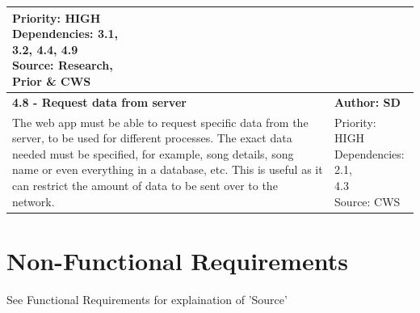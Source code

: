 \documentclass[10pt]{report}
\begin{document}
\begin{center}
\begin{longtable}{| p{13cm} | p{3cm} |}
\makecell{Priority: HIGH\\Dependencies: 3.1,\\3.2, 4.4, 4.9\\Source: Research,\\Prior \& CWS}\\
\hline
\textbf{4.8 -  Request data from server} & \textbf{Author: SD} \\
\hline
The web app must be able to request specific data from the server, to be used for different processes. The exact data needed must be specified, for example, song details, song name or even everything in a database, etc. This is useful as it can restrict the amount of data to be sent over to the network.&
\makecell{Priority: HIGH\\Dependencies: 2.1,\\4.3\\Source: CWS}\\
\hline

\end{longtable}

\end{center}

\section{Non-Functional Requirements}

See Functional Requirements for explaination of 'Source'
\end{document}
